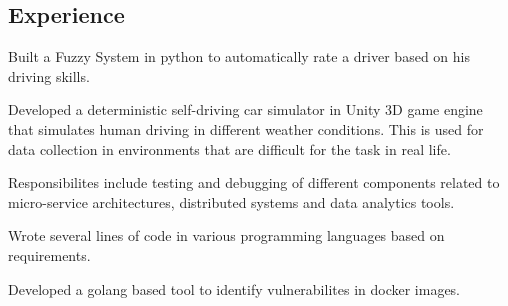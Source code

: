 \documentclass[letterpaper]{deedy-resume} %
\begin{document}
\begin{minipage}[t]{0.66\textwidth} %

\subsection{Experience}


\vspace{\topsep} %
\begin{tightitemize}
\item Built a Fuzzy System in python to automatically rate a driver based on his driving skills.
\item Developed a deterministic self-driving car simulator in Unity 3D game engine that simulates human driving in different weather conditions. This is used for data collection in environments that are difficult for the task in real life.
\end{tightitemize}

\sectionspace %



\begin{tightitemize}
\item Responsibilites include testing and debugging of different components related to micro-service architectures, distributed systems and data analytics tools.
\item Wrote several lines of code in various programming languages based on requirements.
\item Developed a golang based tool to identify vulnerabilites in docker images.
\end{tightitemize}

\sectionspace %




\end{minipage}
\end{document}
